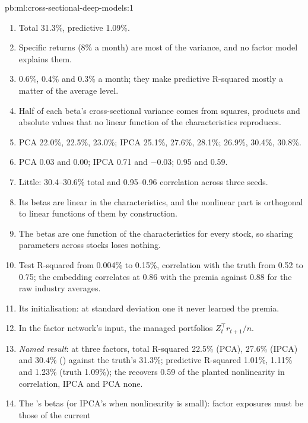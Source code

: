 \begin{solution}{pb:ml:cross-sectional-deep-models:1}
\begin{enumerate}
\item Total 31.3\%, predictive 1.09\%.
\item Specific returns (8\% a month) are most of the variance, and no factor model explains them.
\item 0.6\%, 0.4\% and 0.3\% a month; they make predictive R-squared mostly a matter of the average level.
\item Half of each beta's cross-sectional variance comes from squares, products and absolute values that no linear function
of the characteristics reproduces.
\item PCA 22.0\%, 22.5\%, 23.0\%; IPCA 25.1\%, 27.6\%, 28.1\%;  26.9\%, 30.4\%, 30.8\%.
\item PCA 0.03 and 0.00; IPCA 0.71 and $-0.03$;  0.95 and 0.59.
\item Little: 30.4--30.6\% total and 0.95--0.96 correlation across three seeds.
\item Its betas are linear in the characteristics, and the nonlinear part is orthogonal to linear functions of them by
construction.
\item The betas are one function of the characteristics for every stock, so sharing parameters across stocks loses nothing.
\item Test R-squared from 0.004\% to 0.15\%, correlation with the truth from 0.52 to 0.75; the embedding correlates at 0.86 with
the premia against 0.88 for the raw industry averages.
\item Its initialisation: at standard deviation one it never learned the premia.
\item In the factor network's input, the managed portfolios $Z_t^\top r_{t+1}/n$.
\item \emph{Named result}: at three factors, total R-squared 22.5\% (PCA), 27.6\% (IPCA) and 30.4\% () against the
truth's 31.3\%; predictive R-squared 1.01\%, 1.11\% and 1.23\% (truth 1.09\%); the  recovers 0.59 of the planted
nonlinearity in correlation, IPCA and PCA none.
\item The 's betas (or IPCA's when nonlinearity is small): factor exposures must be those of the current

\end{enumerate}
\end{solution}
